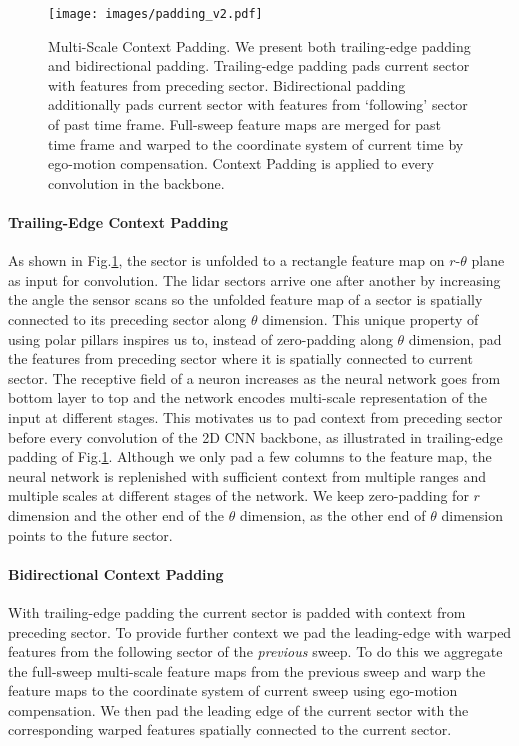\documentclass{article}
\begin{document}
 \begin{figure}
  \centering 
\texttt{[image: images/padding\_v2.pdf]}\vspace{-2mm}
  \caption{Multi-Scale Context Padding. We present both trailing-edge padding and bidirectional padding. Trailing-edge padding pads current sector with features from preceding sector. Bidirectional padding additionally pads current sector with features from `following' sector of past time frame. Full-sweep feature maps are merged for past time frame and warped to the coordinate system of current time by ego-motion compensation. Context Padding is applied to every convolution in the backbone.}\label{fig:padding}
\end{figure}

\vspace{-2mm}\paragraph{Trailing-Edge Context Padding}As shown in Fig.\ref{fig:padding}, the sector is unfolded to a rectangle feature map on $r$-$\theta$ plane as input for convolution. The lidar sectors arrive one after another by increasing the angle the sensor scans so the unfolded feature map of a sector is spatially connected to its preceding sector along $\theta$ dimension. This unique property of using polar pillars inspires us to, instead of zero-padding along $\theta$ dimension, pad the features from preceding sector where it is spatially connected to current sector. The receptive field of a neuron increases as the neural network goes from bottom layer to top and the network encodes multi-scale representation of the input at different stages. This motivates us to pad context from preceding sector before every convolution of the 2D CNN backbone, as illustrated in trailing-edge padding of Fig.\ref{fig:padding}. Although we only pad a few columns to the feature map, the neural network is replenished with sufficient context from multiple ranges and multiple scales at different stages of the network. We keep zero-padding for $r$ dimension and the other end of the $\theta$ dimension, as the other end of $\theta$ dimension points to the future sector.



\vspace{-3mm}\paragraph{Bidirectional Context Padding} With trailing-edge padding the current sector is padded with context from preceding sector. To provide further context we pad the leading-edge with warped features from the following sector of the \emph{previous} sweep. To do this we aggregate the full-sweep multi-scale feature maps from the previous sweep and warp the feature maps to the coordinate system of current sweep using ego-motion compensation. We then pad the leading edge of the current sector with the corresponding warped features spatially connected to the current sector.
\vspace{-3mm}
\end{document}
